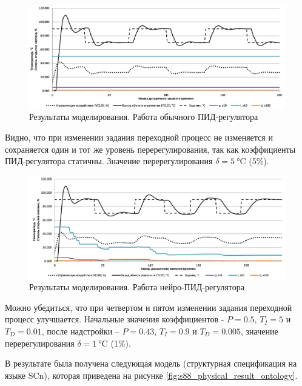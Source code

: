 \begin{figure}[H]
    \centering
    \includegraphics[width=\textwidth]{images/chapter_4/Pasteurization_modeling_results_with_typical_PID.png}
    \caption{Результаты моделирования. Работа обычного ПИД-регулятора}
    \label{fig:Pasteurization_modeling_results_with_typical_PID}
\end{figure}

Видно, что при изменении задания переходной процесс не изменяется и сохраняется один и тот же уровень перерегулирования, так как коэффициенты ПИД-регулятора статичны. Значение перерегулирования $\delta = \SI{5}{\celsius}$ (5\%).

\begin{figure}[H]
    \centering
    \includegraphics[width=\textwidth]{images/chapter_4/Pasteurization_modeling_results_with_neuro_PID.png}
    \caption{Результаты моделирования. Работа нейро-ПИД-регулятора}
    \label{fig:Pasteurization_modeling_results_with_neuro_PID}
\end{figure}

Можно убедиться, что при четвертом и пятом изменении задания переходной процесс улучшается. Начальные значения коэффициентов - $P = 0.5$, $T_I = 5$ и $T_D = 0.01$, после надстройки – $P = 0.43$, $T_I = 0.9$ и $T_D = 0.005$, значение перерегулирования $\delta = \SI{1}{\celsius}$ (1\%).

В результате была получена следующая модель (структурная спецификация на языке SCn), которая приведена на рисунке \ref{fig:s88_physical_result_ontology}.

